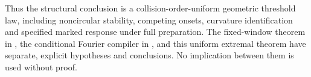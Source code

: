 Thus the structural conclusion is a collision-order-uniform geometric
threshold law, including noncircular stability, competing onsets,
curvature identification and specified marked response under full preparation. The
fixed-window theorem in \cite{TC}, the conditional Fourier compiler in
\cite{A2R33}, and this uniform extremal theorem have separate, explicit
hypotheses and conclusions. No implication between them is used without
proof.
